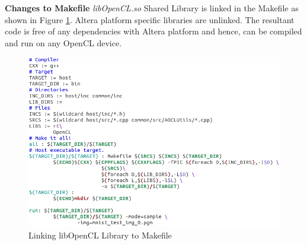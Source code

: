 \textbf{Changes to Makefile}\newline
\textit{libOpenCL.so} Shared Library is linked in the Makefile as shown in Figure \ref{fig:makefile}. Altera platform specific libraries are unlinked.\newline \newline
The resultant code is free of any dependencies with Altera platform and hence, can be compiled and run on any OpenCL device.
\begin{figure}[h!]
\centering
\includegraphics[width=0.7\linewidth]{figures/makefile.png}
\caption{Linking libOpenCL Library to Makefile}
\label{fig:makefile}
\end{figure}
